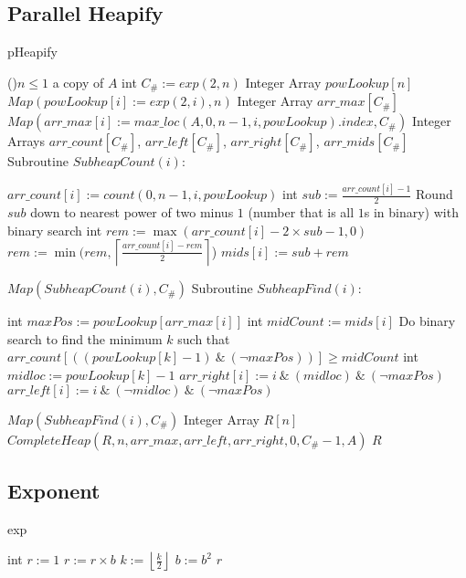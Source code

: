 \documentclass[letterpaper, reqno, 11pt]{article}
\begin{document}
\subsection*{Parallel Heapify}
\begin{algorithm}[H]
\caption{pHeapify}
\If(){$n\leq1$}
{
	\Return a copy of $A$\;
}
int $C_\#:=exp(2, n)$
Integer Array $powLookup[n]$\;
$Map(powLookup[i]:=exp(2,i),n)$
Integer Array $arr\_max[C_\#]$
$Map(arr\_max[i]:=max\_loc(A,0,n-1,i,powLookup).index, C_\#)$\;
Integer Arrays $arr\_count[C_\#]$, $arr\_left[C_\#]$, $arr\_right[C_\#]$, $arr\_mids[C_\#]$\;
Subroutine $SubheapCount(i)$:
\begin{description}
	\item{}
	$arr\_count[i]:=count(0,n-1,i,powLookup)$\;
	int $sub:=\frac{arr\_count[i]-1}{2}$\;
	Round $sub$ down to nearest power of two minus $1$
	(number that is all $1$s in binary) with binary search\;
	int $rem:=\max(arr\_count[i]-2\times sub-1,0)$
	$rem:=\min(rem,\left\lceil\frac{arr\_count[i]-rem}{2}\right\rceil$)
	$mids[i]:=sub+rem$
\end{description}
$Map(SubheapCount(i), C_\#)$\;
Subroutine $SubheapFind(i)$:
\begin{description}
	\item{}
	int $maxPos:=powLookup[arr\_max[i]]$
	int $midCount:=mids[i]$
	Do binary search to find the minimum $k$ such that
	$arr\_count[((powLookup[k]-1)\ \&\ (\neg maxPos))]\geq midCount$
	int $midloc:=powLookup[k]-1$
	$arr\_right[i]:=i\ \&\ (midloc)\ \&\ (\neg maxPos)$\;
	$arr\_left[i]:=i\ \&\ (\neg midloc)\ \&\ (\neg maxPos)$\;
\end{description}
$Map(SubheapFind(i), C_\#)$\;
Integer Array $R[n]$\;
$CompleteHeap(R, n, arr\_max, arr\_left, arr\_right, 0, C_\#-1, A)$\;
\Return $R$\;
\end{algorithm}

\pagebreak
\subsection*{Exponent}
\begin{algorithm}[H]
\caption{exp}
int $r:=1$
{
	{
		$r:=r\times b$\;
	}
	$k:=\left\lfloor\frac{k}{2}\right\rfloor$\;
	$b:=b^2$\;
}
\Return $r$\;
\end{algorithm}
\end{document}
